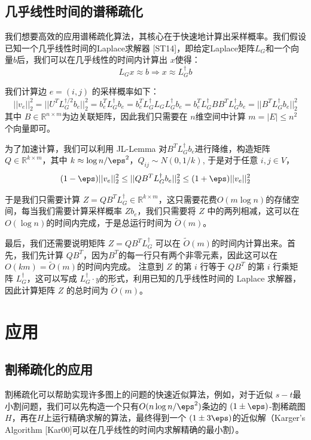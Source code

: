 \subsection{几乎线性时间的谱稀疏化}
我们想要高效的应用谱稀疏化算法，其核心在于快速地计算出采样概率。我们假设已知一个几乎线性时间的Laplace求解器 [ST14]，即给定Laplace矩阵$L_G$和一个向量$b$后，我们可以在几乎线性的时间内计算出 $x$使得：
\[
L_G x\approx b \Rightarrow x\approx L_G^\dagger b
\]

我们计算边 $e=(i,j)$ 的采样概率如下：
\[
||v_e||_2^2 = ||U^T L_G^{\dagger/2} b_e||_2^2 = b_e^T L_G^\dagger b_e =  b_e^T  L_G^\dagger L_G L_G^\dagger b_e = b_e^T  L_G^\dagger BB^T L_G^\dagger b_e = ||B^T L_G^{\dagger} b_e||_2^2
\]
其中 $B\in\mathbb{R}^{n\times m}$为边关联矩阵，因此我们只需要在 $n$维空间中计算 $m=|E|\leq n^2$ 个向量即可。

为了加速计算，我们可以利用 JL-Lemma 对$B^T L_G^{\dagger} b_e$进行降维，构造矩阵 $Q\in\mathbb{R}^{k\times m}$，其中 $k\approx \log n/\eps^2 $，$Q_{ij}\sim N(0,1/k)$, 于是对于任意 $i,j\in V$，
\[
(1-\eps)||v_e||_2^2 \leq ||QB^T L_G^{\dagger} b_e||_2^2\leq (1+\eps)||v_e||_2^2
\]

于是我们只需要计算 $Z = QB^T L_G^{\dagger} \in \mathbb{R}^{k\times m}$，这只需要花费$O(m\log n)$的存储空间，每当我们需要计算采样概率 $Zb_e$，我们只需要将 $Z$ 中的两列相减，这可以在 $O(\log n)$的时间内完成，于是总运行时间为 $\widetilde{O}(m)$。

最后，我们还需要说明矩阵 $Z = QB^T L_G^{\dagger}$ 可以在 $\widetilde{O}(m)$的时间内计算出来。首先，我们先计算 $QB^T$，因为$B^T$的每一行只有两个非零元素，因此这可以在 $O(km)=\widetilde{O}(m)$的时间内完成。
注意到 $Z$ 的第 $i$ 行等于 $QB^T$ 的第 $i$ 行乘矩阵 $L_G^{\dagger}$，这可以写成 $L_G^\dagger\cdot y$的形式，利用已知的几乎线性时间的 Laplace 求解器，因此计算矩阵 $Z$ 的总时间为 $\widetilde{O}(m)$。

\section{应用}
\subsection{割稀疏化的应用}
割稀疏化可以帮助实现许多图上的问题的快速近似算法，例如，对于近似 $s-t$最小割问题，我们可以先构造一个只有$O(n\log n/\eps^2)$条边的 $(1\pm\eps)$-割稀疏图$H$，再在$H$上运行精确求解的算法，最终得到一个 $(1\pm 3\eps)$的近似解（Karger's Algorithm [Kar00]可以在几乎线性的时间内求解精确的最小割）。

